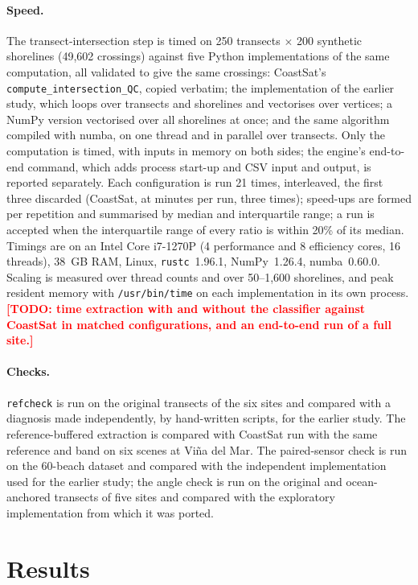 \documentclass[authoryear,preprint,review,12pt]{elsarticle}
\newcommand{\todo}[1]{\textcolor{red}{\textbf{[TODO: #1]}}}
\begin{document}
\paragraph{Speed.} The transect-intersection step is timed on 250 transects
$\times$ 200 synthetic shorelines (49,602 crossings) against five Python
implementations of the same computation, all validated to give the same
crossings: CoastSat's \texttt{compute\_intersection\_QC}, copied verbatim; the
implementation of the earlier study, which loops over transects and shorelines
and vectorises over vertices; a NumPy version vectorised over all shorelines at
once; and the same algorithm compiled with numba, on one thread and in parallel
over transects. Only the computation is timed, with inputs in memory on both
sides; the engine's end-to-end command, which adds process start-up and CSV
input and output, is reported separately. Each configuration is run 21 times,
interleaved, the first three discarded (CoastSat, at minutes per run, three
times); speed-ups are formed per repetition and summarised by median and
interquartile range; a run is accepted when the interquartile range of every
ratio is within 20\% of its median. Timings are on an Intel Core i7-1270P (4
performance and 8 efficiency cores, 16 threads), 38~GB RAM, Linux,
\texttt{rustc}~1.96.1, NumPy~1.26.4, numba~0.60.0. Scaling is measured over
thread counts and over 50--1,600 shorelines, and peak resident memory with
\texttt{/usr/bin/time} on each implementation in its own process.
\todo{time extraction with and without the classifier against CoastSat in
matched configurations, and an end-to-end run of a full site.}

\paragraph{Checks.} \texttt{refcheck} is run on the original transects of the
six sites and compared with a diagnosis made independently, by hand-written
scripts, for the earlier study. The reference-buffered extraction is compared
with CoastSat run with the same reference and band on six scenes at Vi\~na del
Mar. The paired-sensor check is run on the 60-beach dataset and compared with the
independent implementation used for the earlier study; the angle check is run
on the original and ocean-anchored transects of five sites and compared with
the exploratory implementation from which it was ported.

\section{Results}\label{sec:results}
\end{document}
